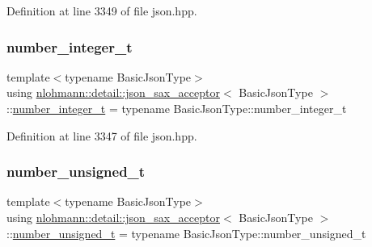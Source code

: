 Definition at line 3349 of file json.\+hpp.

\mbox{\label{classnlohmann_1_1detail_1_1json__sax__acceptor_a41876b17c0e8bdb55580eaf5e4e2ded8}} 
\subsubsection{\texorpdfstring{number\_integer\_t}{number\_integer\_t}}
{\footnotesize\ttfamily template$<$typename Basic\+Json\+Type$>$ \\
using \mbox{\hyperlink{classnlohmann_1_1detail_1_1json__sax__acceptor}{nlohmann\+::detail\+::json\+\_\+sax\+\_\+acceptor}}$<$ Basic\+Json\+Type $>$\+::\mbox{\hyperlink{classnlohmann_1_1detail_1_1json__sax__acceptor_a41876b17c0e8bdb55580eaf5e4e2ded8}{number\+\_\+integer\+\_\+t}} =  typename Basic\+Json\+Type\+::number\+\_\+integer\+\_\+t}



Definition at line 3347 of file json.\+hpp.

\mbox{\label{classnlohmann_1_1detail_1_1json__sax__acceptor_ae07454608ea6f3cfb765f95e3c850043}} 
\subsubsection{\texorpdfstring{number\_unsigned\_t}{number\_unsigned\_t}}
{\footnotesize\ttfamily template$<$typename Basic\+Json\+Type$>$ \\
using \mbox{\hyperlink{classnlohmann_1_1detail_1_1json__sax__acceptor}{nlohmann\+::detail\+::json\+\_\+sax\+\_\+acceptor}}$<$ Basic\+Json\+Type $>$\+::\mbox{\hyperlink{classnlohmann_1_1detail_1_1json__sax__acceptor_ae07454608ea6f3cfb765f95e3c850043}{number\+\_\+unsigned\+\_\+t}} =  typename Basic\+Json\+Type\+::number\+\_\+unsigned\+\_\+t}



